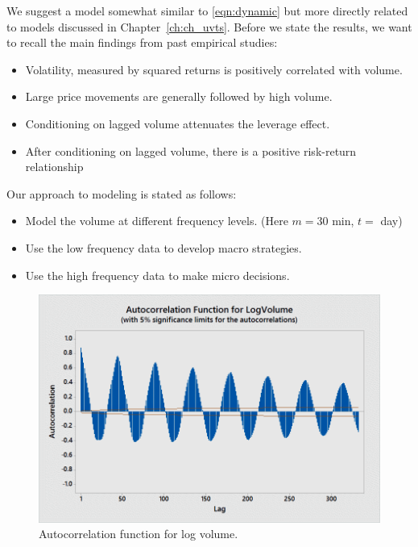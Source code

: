 We suggest a model somewhat similar to \eqref{eqn:dynamic} but more directly related to models discussed in Chapter~\ref{ch:ch_uvts}. Before we state the results, we want to recall the main findings from past empirical studies:
	\begin{itemize}
	\item Volatility, measured by squared returns is positively correlated with volume.
	\item Large price movements are generally followed by high volume.
	\item Conditioning on lagged volume attenuates the leverage effect.
	\item After conditioning on lagged volume, there is a positive risk-return relationship
	\end{itemize}
Our approach to modeling is stated as follows:
	\begin{itemize}
	\item Model the volume at different frequency levels. (Here $m=30 \text{ min}$, $t=$ day)
	\item Use the low frequency data to develop macro strategies.
	\item Use the high frequency data to make micro decisions.
	\end{itemize}

        \begin{figure}[!ht]
        \centering
        \includegraphics[width=\textwidth]{chapters/chapter_stat_ts/figures/logvol.png}
        \caption{Autocorrelation function for log volume. \label{fig:logvolumeauto}}
        \end{figure}
        
